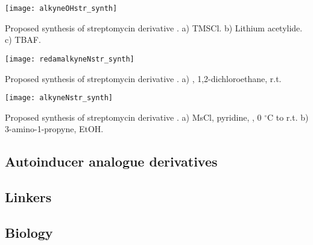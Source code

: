 \begin{scheme}[H]
	\begin{center}
		\texttt{[image: alkyneOHstr\_synth]}
		\caption{Proposed synthesis of streptomycin derivative . a) TMSCl. b) Lithium acetylide. c) TBAF. \label{sch:alkyneOHstr_synth}}
	\end{center}
\end{scheme}

\begin{scheme}[H]
	\begin{center}
		\texttt{[image: redamalkyneNstr\_synth]}
		\caption{Proposed synthesis of streptomycin derivative . 
		a) , 1,2-dichloroethane, r.t.
		\label{sch:redamalkyneNstr_synth}}
	\end{center}
\end{scheme}

\begin{scheme}[H]
	\begin{center}
		\texttt{[image: alkyneNstr\_synth]}
		\caption{Proposed synthesis of streptomycin derivative . 
		a) MsCl, pyridine, , 0 $^{\circ}$C to r.t. 
		b) 3-amino-1-propyne, EtOH.
		\label{sch:alkyneNstr_synth}}
	\end{center}
\end{scheme}

\subsection{Autoinducer analogue derivatives}

\subsection{Linkers}

\subsection{Biology}